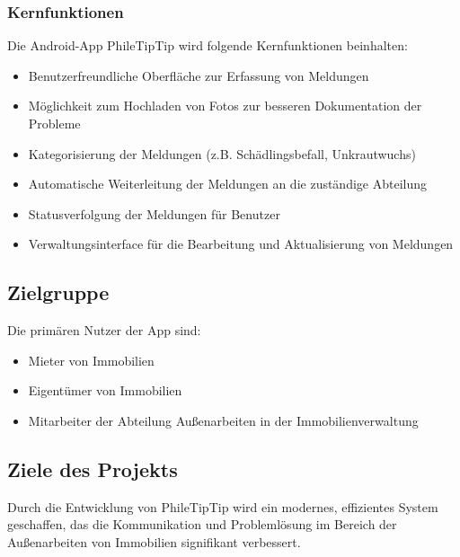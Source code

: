 \subsubsection{Kernfunktionen}

Die Android-App PhileTipTip wird folgende Kernfunktionen beinhalten:
\begin{itemize}
  \item  Benutzerfreundliche Oberfläche zur Erfassung von Meldungen
  \item  Möglichkeit zum Hochladen von Fotos zur besseren Dokumentation der Probleme
  \item  Kategorisierung der Meldungen (z.B. Schädlingsbefall, Unkrautwuchs)
  \item  Automatische Weiterleitung der Meldungen an die zuständige Abteilung
  \item  Statusverfolgung der Meldungen für Benutzer
  \item  Verwaltungsinterface für die Bearbeitung und Aktualisierung von Meldungen
\end{itemize}

\subsection{Zielgruppe}

Die primären Nutzer der App sind:
\begin{itemize}
  \item  Mieter von Immobilien
  \item  Eigentümer von Immobilien
  \item  Mitarbeiter der Abteilung Außenarbeiten in der Immobilienverwaltung
\end{itemize}

\subsection{Ziele des Projekts}

Durch die Entwicklung von PhileTipTip wird ein modernes, effizientes System geschaffen, das die Kommunikation und Problemlösung im Bereich der Außenarbeiten von Immobilien signifikant verbessert.